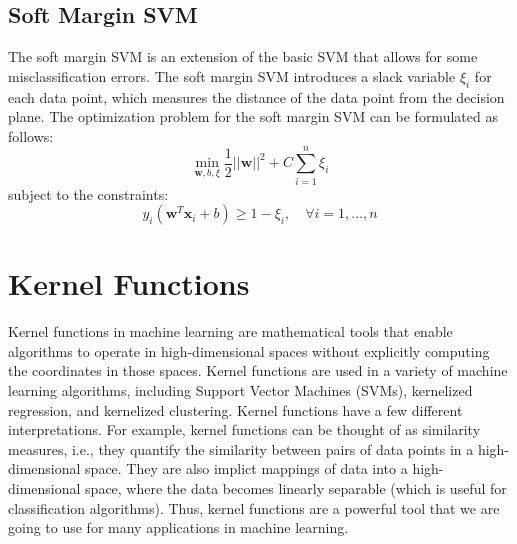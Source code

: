 \documentclass{article}[11pt]
\newcommand{\norm}[1]{\left|\left|#1\right|\right|}
\begin{document}
\subsection{Soft Margin SVM}
The soft margin SVM is an extension of the basic SVM that allows for some misclassification errors.
The soft margin SVM introduces a slack variable $\xi_i$ for each data point, which measures the distance of the data point from the decision plane.
The optimization problem for the soft margin SVM can be formulated as follows:
\begin{equation}
\min_{\mathbf{w},b,\xi} \frac{1}{2} \norm{\mathbf{w}}^2 + C\sum_{i=1}^{n} \xi_i
\end{equation}
subject to the constraints:
\begin{equation}
y_i(\mathbf{w}^T\mathbf{x}_i + b) \geq 1 - \xi_i, \quad \forall i = 1, \ldots, n
\end{equation}

\section{Kernel Functions}
Kernel functions in machine learning are mathematical tools that enable algorithms to operate in high-dimensional spaces without explicitly computing the coordinates in those spaces.
Kernel functions are used in a variety of machine learning algorithms, including Support Vector Machines (SVMs), kernelized regression, and kernelized clustering.
Kernel functions have a few different interpretations. 
For example, kernel functions can be thought of as similarity measures, i.e., they quantify the similarity between pairs of data points in a high-dimensional space.
They are also implict mappings of data into a high-dimensional space, where the data becomes linearly separable (which is useful for classification algorithms).
Thus, kernel functions are a powerful tool that we are going to use for many applications in machine learning.
\end{document}
